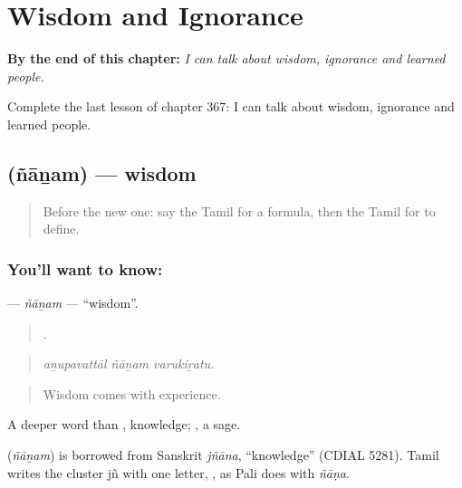 
\chapter{Wisdom and Ignorance}
\label{ch:ta-wisdom-and-ignorance}

\begin{chapteropening}
\textbf{By the end of this chapter:} \emph{I can talk about wisdom, ignorance and learned people.}

Complete the last lesson of chapter 367: I can talk about wisdom, ignorance and learned people.
\end{chapteropening}

\section[\texorpdfstring{\ta{ஞானம்} (ñāṉam)}{ஞானம் (ñāṉam)}]{ (ñāṉam) — wisdom}

\label{lesson:TA-C367-nanam}



\begin{quote}
Before the new one: say the Tamil for a formula, then the Tamil for to define.
\end{quote}

\subsection*{You'll want to know: }
\textbf{} — \emph{ñāṉam} — \textquotedblleft{}wisdom\textquotedblright{}.

\begin{quote}
  .
\end{quote}

\begin{quote}
\emph{aṉupavattāl ñāṉam varukiṟatu.}
\end{quote}

\begin{quote}
Wisdom comes with experience.
\end{quote}

A deeper word than , knowledge; , a sage.

\begin{cousinweb}
\textbf{} (\emph{ñāṉam}) is borrowed from Sanskrit \emph{jñāna}, \textquotedblleft{}knowledge\textquotedblright{} (CDIAL 5281). Tamil writes the cluster jñ with one letter, , as Pali does with \emph{ñāṇa}.
\end{cousinweb}


